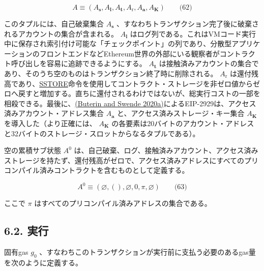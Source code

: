 \documentclass[
]{ltjsarticle}
\begin{document}
\protect\hypertarget{eq-62}{}{}

\[A \equiv (A_{\mathbf{s}}, A_{\mathbf{l}}, A_{\mathbf{t}}, A_{\mathrm{r}}, A_{\mathbf{a}}, A_{\mathbf{K}}) \qquad \text{(62)}\]

\hypertarget{self_destruct_set_wordy_defn_A__s}{}

このタプルには、自己破棄集合 \(A_{\mathbf{s}}\)
、すなわちトランザクション完了後に破棄されるアカウントの集合が含まれる。\protect\hypertarget{tx_log_series_wordy_defn_A__l}{}{}
\(A_{\mathbf{l}}\)
はログ列である。これはVMコード実行中に保存され索引付け可能な「チェックポイント」の列であり、分散型アプリケーションのフロントエンドなどEthereum世界の外部にいる観察者がコントラクト呼び出しを容易に追跡できるようにする。\protect\hypertarget{tx_touched_accounts_wordy_defn_A__t}{}{}
\(A_{\mathbf{t}}\)
は接触済みアカウントの集合であり、そのうち空のものはトランザクション終了時に削除される。\protect\hypertarget{refund_balance_defn_words_A__r}{}{}
\(A_{\mathrm{r}}\)
は還付残高であり、\protect\hyperlink{SSTORE}{SSTORE}命令を使用してコントラクト・ストレージを非ゼロ値からゼロへ戻すと増加する。直ちに還付されるわけではないが、総実行コストの一部を相殺できる。最後に、\protect\hyperlink{ref-EIP-2929}{(Buterin
and Swende
2020a)}によるEIP-2929は、\protect\hypertarget{accessed_addresses_defn_words_A__a}{}{}アクセス済みアカウント・アドレス集合
\(A_{\mathbf{a}}\)
と、\protect\hypertarget{accessed_storage_keys_defn_words_A__k}{}{}アクセス済みストレージ・キー集合
\(A_{\mathbf{K}}\) を導入した（より正確には、 \(A_{\mathbf{K}}\)
の各要素は20バイトのアカウント・アドレスと32バイトのストレージ・スロットからなるタプルである）。

空の累積サブ状態 \(A^0\)
は、自己破棄、ログ、接触済みアカウント、アクセス済みストレージを持たず、還付残高がゼロで、アクセス済みアドレスにすべてのプリコンパイル済みコントラクトを含むものとして定義する。

\protect\hypertarget{eq-63}{}{}

\[A^0 \equiv (\varnothing, (), \varnothing, 0, \pi, \varnothing) \qquad \text{(63)}\]

ここで \(\pi\) はすべてのプリコンパイル済みアドレスの集合である。

\hypertarget{ux5b9fux884c}{%
\subsection{6.2. 実行}\label{ux5b9fux884c}}

\hypertarget{intrinsic_gas_g_0}{}

固有gas \(g_0\)
、すなわちこのトランザクションが実行前に支払う必要のあるgas量を次のように定義する。
\end{document}
